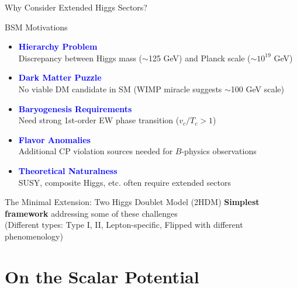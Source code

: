 \documentclass{../bredelebeamer}
\begin{document}
\begin{frame}{Why Consider Extended Higgs Sectors?}
    \begin{block}{BSM Motivations}
        \begin{itemize}
            \item \textcolor{blue}{\textbf{Hierarchy Problem}} \\ 
            \small Discrepancy between Higgs mass ($\sim$125 GeV) and Planck scale ($\sim10^{19}$ GeV)
            
            \item \textcolor{blue}{\textbf{Dark Matter Puzzle}} \\ 
            \small No viable DM candidate in SM (WIMP miracle suggests $\sim$100 GeV scale)
            
            \item \textcolor{blue}{\textbf{Baryogenesis Requirements}} \\ 
            \small Need strong 1st-order EW phase transition ($v_c/T_c > 1$)
            
            \item \textcolor{blue}{\textbf{Flavor Anomalies}} \\ 
            \small Additional CP violation sources needed for $B$-physics observations
            
            \item \textcolor{blue}{\textbf{Theoretical Naturalness}} \\ 
            \small SUSY, composite Higgs, etc. often require extended sectors
        \end{itemize}
    \end{block}
    
    \vspace{0.5cm}
    
    \begin{exampleblock}{The Minimal Extension: Two Higgs Doublet Model (2HDM)}
        \centering
        \textbf{Simplest framework} addressing some of these challenges \\ 
        {\footnotesize (Different types: Type I, II, Lepton-specific, Flipped with different phenomenology)}
    \end{exampleblock}
\end{frame}

\section{On the Scalar Potential}
\end{document}
